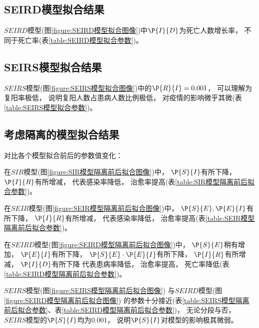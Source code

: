 \subsection{SEIRD模型拟合结果}
\par $SEIRD$模型(图\ref{figure:SEIRD模型拟合图像})中$\P{I}{D}$为死亡人数增长率，
不同于死亡率(表\ref{table:SEIRD模型拟合参数})。
\subsection{SEIRS模型拟合结果}
\par $SEIRS$模型(图\ref{figure:SEIRS模型拟合图像})中的$\P{R}{I}=0.001$，
可以理解为复阳率极低，
说明复阳人数占患病人数比例极低，
对疫情的影响微乎其微(表\ref{table:SEIRS模型拟合参数})。
\subsection{考虑隔离的模型拟合结果}
\par 对比各个模型拟合前后的参数值变化：
\par 在$SIR$模型(图\ref{figure:SIR模型隔离前后拟合图像})中，
$\P{S}{I}$有所下降，
$\P{I}{R}$有所增减，
代表感染率降低，
治愈率提高(表\ref{table:SIR模型隔离前后拟合参数})。
\par 在$SEIR$模型(图\ref{figure:SEIR模型隔离前后拟合图像})中，
$\P{S}{E},\P{E}{I}$有所下降，
$\P{I}{R}$有所增减，
代表感染率降低，
治愈率提高(表\ref{table:SEIR模型隔离前后拟合参数})。
\par 在$SEIRD$模型(图\ref{figure:SEIRD模型隔离前后拟合图像})中，
$\P{S}{E}$稍有增加，
$\P{E}{I}$有所下降，
$\P{S}{E}\cdot \P{E}{I}$有所下降，
$\P{I}{R}$有所增减，
$\P{I}{D}$有所下降
代表患病率降低，
治愈率提高，
死亡率降低(表\ref{table:SEIRD模型隔离前后拟合参数})。
\par $SEIRS$模型(图\ref{figure:SEIRS模型隔离前后拟合图像})
与$SEIRD$模型(图\ref{figure:SEIRD模型隔离前后拟合图像})
的参数十分接近(表\ref{table:SEIRS模型隔离前后拟合参数}、表\ref{table:SEIRD模型隔离前后拟合参数})，
无论分段与否，$SEIRS$模型的$\P{S}{I}$均为$0.001$，
说明$\P{S}{I}$对模型的影响极其微弱。
